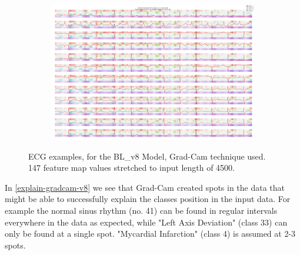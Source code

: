 \begin{figure}
	\begin{subfigure}{1\textwidth}\centering
		\includegraphics[width=\linewidth]{"bilder/HR07448-class:[4, 16, 33, 41]-gradient-cambl8.png"}
		\centering
	\end{subfigure}	
	\caption{ECG examples, for the BL\_v8 Model, Grad-Cam technique used. 147 feature map values stretched to input length of 4500.}
	\label{explain-gradcam-v8}
\end{figure}
In \autoref{explain-gradcam-v8} we see that Grad-Cam created spots in the data that might be able to successfully explain the classes position in the input data. For example the normal sinus rhythm (no. 41) can be found in regular intervals everywhere in the data as expected, while "Left Axis Deviation" (class 33) can only be found at a single spot. "Mycardial Infarction" (class 4) is assumed at 2-3 spots.

